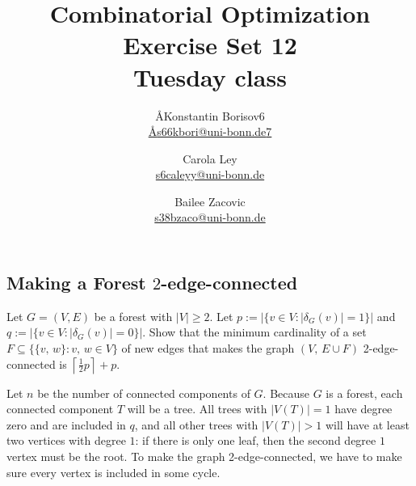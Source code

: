 \documentclass{article}
\title{Combinatorial Optimization \\ Exercise Set 12 \\ Tuesday class}
\author{
  \AA{Konstantin Borisov}{6} \\
  \href{mailto:\AA{s66kbori@uni-bonn.de}{7}}{\AA{s66kbori@uni-bonn.de}{7}}
  \and
  Carola Ley \\
  \href{mailto:s6caleyy@uni-bonn.de}{s6caleyy@uni-bonn.de}
  \and
  Bailee Zacovic \\
  \href{mailto:s38bzaco@uni-bonn.de}{s38bzaco@uni-bonn.de}
}
\begin{document}
  \maketitle

  \setcounter{section}{12}
  \subsection{Making a Forest $2$-edge-connected}
  \begin{centerframebox}
    Let $G = (V, E)$ be a forest with $|V| \geq 2$.
    Let $p := |\{v \in V : |\delta_G(v)| = 1\}|$ and $q := |\{v \in V : |\delta_G(v)| = 0\}|$.
    Show that the minimum cardinality of a set $F \subseteq \{\{v,\, w\} : v,\, w \in V\}$
    of new edges that makes the graph $(V,\, E \cup F)$ 2-edge-connected is $\left\lceil\frac{1}{2} p\right\rceil + p$.
  \end{centerframebox}
  Let $n$ be the number of connected components of $G$.
  Because $G$ is a forest, each connected component $T$ will be a tree.
  All trees with $|V(T)| = 1$ have degree zero and are included in $q$,
  and all other trees with $|V(T)| > 1$ will have at least two vertices with degree $1$:
  if there is only one leaf, then the second degree $1$ vertex must be the root.
  To make the graph 2-edge-connected, we have to make sure every vertex is included in some cycle.
\end{document}
